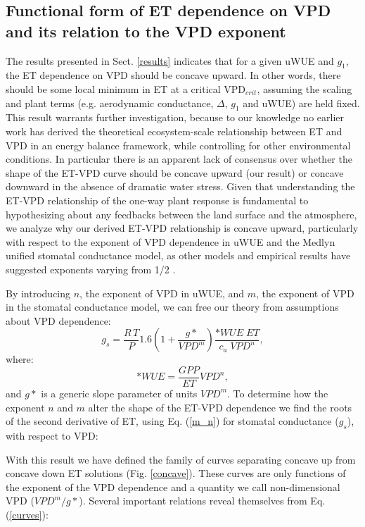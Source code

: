 \subsection{Functional form of ET dependence on VPD and its relation
  to the VPD exponent}
\label{functional_form}

The results presented in Sect. \ref{results} indicates that for a
given uWUE and $g_1$, the ET dependence on VPD should be concave
upward. In other words, there should be some local minimum in ET at a
critical VPD$_{crit}$, assuming the scaling and plant terms
(e.g. aerodynamic conductance, $\Delta$, $g_1$ and uWUE) are held
fixed. This result warrants further investigation, because to our
knowledge no earlier work has derived the theoretical ecosystem-scale
relationship between ET and VPD in an energy balance framework, while
controlling for other environmental conditions. In particular there is
an apparent lack of consensus over whether the shape of the ET-VPD
curve should be concave upward (our result) or concave downward in the
absence of dramatic water stress. Given that understanding the ET-VPD
relationship of the one-way plant response is fundamental to
hypothesizing about any feedbacks between the land surface and the
atmosphere, we analyze why our derived ET-VPD relationship is concave
upward, particularly with respect to the exponent of VPD dependence in
uWUE and the Medlyn unified stomatal conductance model, as other
models and empirical results have suggested exponents varying from 1/2
\cite{Leuning_1990, Zhou_2015, Lin_2018}.

By introducing $n$, the exponent of VPD in uWUE, and $m$, the exponent
of VPD in the stomatal conductance model, we can free our theory from
assumptions about VPD dependence:
  \begin{equation}
    g_s = \frac{R \, T}{P} 1.6 \left(1 + \frac{g*}{VPD^m}\right) \frac{*WUE \; ET}{c_a \; VPD^n},
    \label{m_n}
  \end{equation}
where:
\[*WUE = \frac{GPP}{ET}VPD^n,\] and $g*$ is a generic slope parameter
of units $VPD^m$. To determine how the exponent $n$ and $m$ alter the
shape of the ET-VPD dependence we find the roots of the second
derivative of ET, using Eq. (\ref{m_n}) for stomatal conductance
($g_s$), with respect to VPD:



With this
result we have defined the family of curves separating concave up from
concave down ET solutions (Fig. \ref{concave}). These curves are
only functions of the exponent of the VPD dependence and a quantity we
call non-dimensional VPD ($VPD^m/g*$). Several important
relations reveal themselves from Eq. (\ref{curves}):

